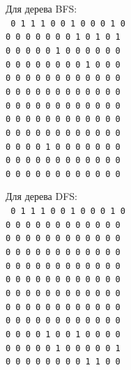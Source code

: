 \begin{minipage}[t]{0.4\linewidth}
  \begin{center}
    \begin{framed}
      \noindent%
      Для дерева BFS:\\
      \footnotesize\texttt{%
        0 1 1 1 0 0 1 0 0 0 1 0\\
        0 0 0 0 0 0 0 1 0 1 0 1\\
        0 0 0 0 0 1 0 0 0 0 0 0\\
        0 0 0 0 0 0 0 0 1 0 0 0\\
        0 0 0 0 0 0 0 0 0 0 0 0\\
        0 0 0 0 0 0 0 0 0 0 0 0\\
        0 0 0 0 0 0 0 0 0 0 0 0\\
        0 0 0 0 0 0 0 0 0 0 0 0\\
        0 0 0 0 0 0 0 0 0 0 0 0\\
        0 0 0 0 1 0 0 0 0 0 0 0\\
        0 0 0 0 0 0 0 0 0 0 0 0\\
        0 0 0 0 0 0 0 0 0 0 0 0\\
      }
    \end{framed}
  \end{center}
  \begin{center}
    \begin{framed}
      \noindent%
      Для дерева DFS:\\
      \footnotesize\texttt{%
        0 1 1 1 0 0 1 0 0 0 1 0\\
        0 0 0 0 0 0 0 0 0 0 0 0\\
        0 0 0 0 0 0 0 0 0 0 0 0\\
        0 0 0 0 0 0 0 0 0 0 0 0\\
        0 0 0 0 0 0 0 0 0 0 0 0\\
        0 0 0 0 0 0 0 0 0 0 0 0\\
        0 0 0 0 0 0 0 0 0 0 0 0\\
        0 0 0 0 0 0 0 0 0 0 0 0\\
        0 0 0 0 0 0 0 0 0 0 0 0\\
        0 0 0 0 1 0 0 1 0 0 0 0\\
        0 0 0 0 0 1 0 0 0 0 0 1\\
        0 0 0 0 0 0 0 0 1 1 0 0\\
      }
    \end{framed}
  \end{center}
\end{minipage}
\hfill

